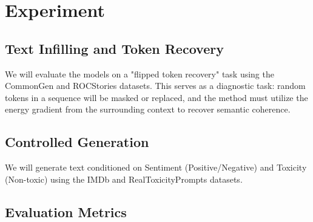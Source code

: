 \documentclass[11pt]{article}
\begin{document}


\section{Experiment}

\subsection{Text Infilling and Token Recovery}
We will evaluate the models on a "flipped token recovery" task using the CommonGen and ROCStories datasets. This serves as a diagnostic task: random tokens in a sequence will be masked or replaced, and the method must utilize the energy gradient from the surrounding context to recover semantic coherence.
\subsection{Controlled Generation}
We will generate text conditioned on Sentiment (Positive/Negative) and Toxicity (Non-toxic) using the IMDb and RealToxicityPrompts datasets.


\subsection{Evaluation Metrics}
\label{subsec:evaluation_metrics}
\end{document}
